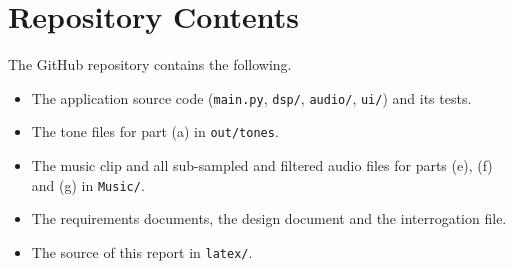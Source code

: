 \documentclass[12pt, letterpaper]{article}
\begin{document}
\section{Repository Contents}

The GitHub repository \href{\repourl}{\texttt{\repourl}} contains the following.
\begin{itemize}
  \item The application source code (\texttt{main.py}, \texttt{dsp/}, \texttt{audio/}, \texttt{ui/}) and its tests.
  \item The tone files for part (a) in \texttt{out/tones}.
  \item The music clip and all sub-sampled and filtered audio files for parts (e), (f) and (g) in \texttt{Music/}.
  \item The requirements documents, the design document and the interrogation file.
  \item The source of this report in \texttt{latex/}.
\end{itemize}
\end{document}
